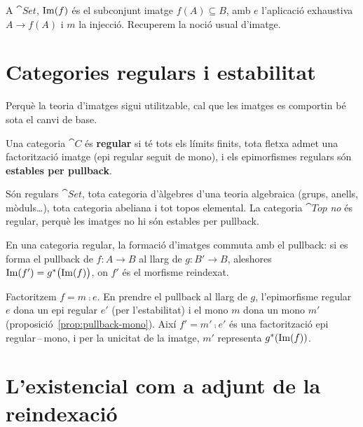 \begin{observacio}
A $\cat{Set}$, $\operatorname{Im}(f)$ és el subconjunt imatge $f(A)\subseteq B$, amb $e$ l'aplicació exhaustiva $A\to f(A)$ i $m$ la injecció. Recuperem la noció usual d'imatge.
\end{observacio}

\section{Categories regulars i estabilitat}

Perquè la teoria d'imatges sigui utilitzable, cal que les imatges es comportin bé sota el canvi de base.

\begin{definicio}
\label{def:regular}
Una categoria $\cat{C}$ és \textbf{regular} si té tots els límits finits, tota fletxa admet una factorització imatge (epi regular seguit de mono), i els epimorfismes regulars són \textbf{estables per pullback}.
\end{definicio}

\begin{exemple}
Són regulars $\cat{Set}$, tota categoria d'àlgebres d'una teoria algebraica (grups, anells, mòduls\ldots), tota categoria abeliana i tot topos elemental. La categoria $\cat{Top}$ \emph{no} és regular, perquè les imatges no hi són estables per pullback.
\end{exemple}

\begin{proposicio}
\label{prop:imatge-estable}
En una categoria regular, la formació d'imatges commuta amb el pullback: si es forma el pullback de $f\colon A\to B$ al llarg de $g\colon B'\to B$, aleshores $\operatorname{Im}(f')=g^{*}\bigl(\operatorname{Im}(f)\bigr)$, on $f'$ és el morfisme reindexat.
\end{proposicio}

\begin{prova}
Factoritzem $f=m\comp e$. En prendre el pullback al llarg de $g$, l'epimorfisme regular $e$ dona un epi regular $e'$ (per l'estabilitat) i el mono $m$ dona un mono $m'$ (proposició~\ref{prop:pullback-mono}). Així $f'=m'\comp e'$ és una factorització epi regular\,--\,mono, i per la unicitat de la imatge, $m'$ representa $g^{*}(\operatorname{Im}(f))$.
\end{prova}

\section{L'existencial com a adjunt de la reindexació}

